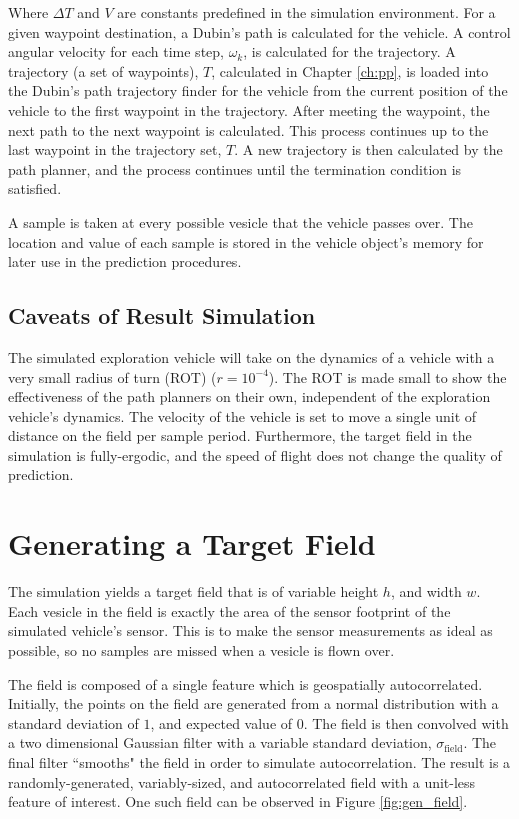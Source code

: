Where $\Delta T$ and $V$ are constants predefined in the simulation environment. For a given waypoint destination, a Dubin's path is calculated for the vehicle. A control angular velocity for each time step, $\omega_k$, is calculated for the trajectory. A trajectory (a set of waypoints), $T$, calculated in Chapter \ref{ch:pp}, is loaded into the Dubin's path trajectory finder for the vehicle from the current position of the vehicle to the first waypoint in the trajectory. After meeting the waypoint, the next path to the next waypoint is calculated. This process continues up to the last waypoint in the trajectory set, $T$. A new trajectory is then calculated by the path planner, and the process continues until the termination condition is satisfied.

A sample is taken at every possible vesicle that the vehicle passes over. The location and value of each sample is stored in the vehicle object's memory for later use in the prediction procedures.

\subsection{Caveats of Result Simulation}
The simulated exploration vehicle will take on the dynamics of a vehicle with a very small radius of turn (ROT) ($r = 10^{-4}$). The ROT is made small to show the effectiveness of the path planners on their own, independent of the exploration vehicle's dynamics. The velocity of the vehicle is set to move a single unit of distance on the field per sample period. Furthermore, the target field in the simulation is fully-ergodic, and the speed of flight does not change the quality of prediction.

\section{Generating a Target Field}
The simulation yields a target field that is of variable height $h$, and width $w$. Each vesicle in the field is exactly the area of the sensor footprint of the simulated vehicle's sensor. This is to make the sensor measurements as ideal as possible, so no samples are missed when a vesicle is flown over.

The field is composed of a single feature which is geospatially autocorrelated. Initially, the points on the field are generated from a normal distribution with a standard deviation of $1$, and expected value of $0$. The field is then convolved with a two dimensional Gaussian filter with a variable standard deviation, $\sigma_{\text{field}}$. The final filter ``smooths" the field in order to simulate autocorrelation. The result is a randomly-generated, variably-sized, and autocorrelated field with a unit-less feature of interest. One such field can be observed in Figure \ref{fig:gen_field}.


